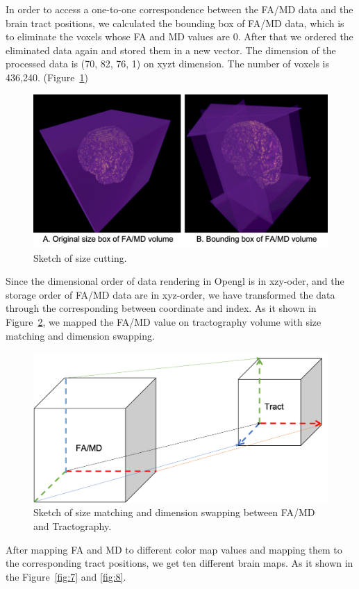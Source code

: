 \documentclass[hyperref, plainreport, noproblem]{cgvpub1}
\begin{document}
In order to access a one-to-one correspondence between the FA/MD data and the brain tract positions, we calculated the bounding box of FA/MD data, which is to eliminate the voxels whose FA and MD values are 0. After that we ordered the eliminated data again and stored them in a new vector. The dimension of the processed data is (70, 82, 76, 1) on xyzt dimension. The number of voxels is 436,240. (Figure~\ref{fig:5})

\begin{figure}[ht]
    \centering
    \includegraphics[width = 0.8\columnwidth]{5}
    \caption{Sketch of size cutting.}
    \label{fig:5}
\end{figure}	


Since the dimensional order of data rendering in Opengl is in xzy-oder, and the storage order of FA/MD data are in xyz-order, we have transformed the data through the corresponding between coordinate and index. As it shown in Figure~\ref{fig:6}, we mapped the FA/MD value on tractography volume with size matching and dimension swapping.

\begin{figure}[ht]
    \centering
    \includegraphics[width = 0.8\columnwidth]{6}
    \caption{Sketch of size matching and dimension swapping between FA/MD and Tractography.}
    \label{fig:6}
\end{figure}	

After mapping FA and MD to different color map values and mapping them to the corresponding tract positions, we get ten different brain maps. As it shown in the Figure~\ref{fig:7} and \ref{fig:8}.
\end{document}
